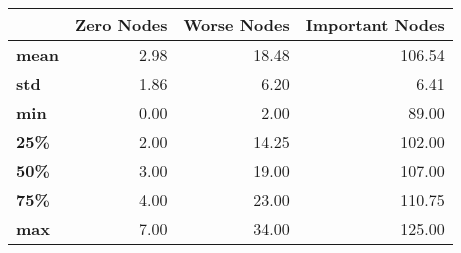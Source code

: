 \begin{tabular}{lrrr}
\toprule
{} &  Zero Nodes &  Worse Nodes &  Important Nodes \\
\midrule
\textbf{mean} &        2.98 &        18.48 &           106.54 \\
\textbf{std } &        1.86 &         6.20 &             6.41 \\
\textbf{min } &        0.00 &         2.00 &            89.00 \\
\textbf{25\% } &        2.00 &        14.25 &           102.00 \\
\textbf{50\% } &        3.00 &        19.00 &           107.00 \\
\textbf{75\% } &        4.00 &        23.00 &           110.75 \\
\textbf{max } &        7.00 &        34.00 &           125.00 \\
\bottomrule
\end{tabular}
